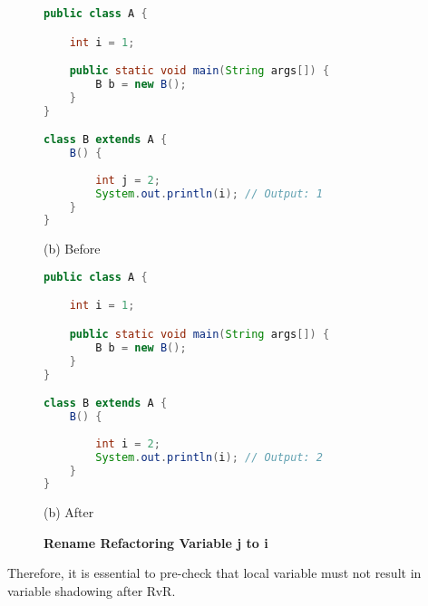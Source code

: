\begin{figure}[th]
\centering
\begin{minipage}[t]{0.8\linewidth}
\begin{lstlisting}[language=java, basicstyle=\scriptsize\ttfamily,frame=single]
public class A {

    int i = 1;

    public static void main(String args[]) {
        B b = new B(); 
    }
}

class B extends A {
    B() {
    	
        int j = 2;
        System.out.println(i); // Output: 1
    }
}
\end{lstlisting}
\centering(b) Before 
\end{minipage}
\hfill
\begin{minipage}[t]{0.8\linewidth}
\begin{lstlisting}[language=java, basicstyle=\scriptsize\ttfamily,frame=single]
public class A {

    int i = 1;

    public static void main(String args[]) {
        B b = new B(); 
    }
}

class B extends A {
    B() {
    	
        int i = 2;
        System.out.println(i); // Output: 2
    }
}
\end{lstlisting}
\centering(b) After 
\end{minipage}
\caption{\textbf{Rename Refactoring Variable j to i}}
\label{figure:precond5_4}
\end{figure}


Therefore, it is essential to pre-check that local variable must not result in variable shadowing after RvR.